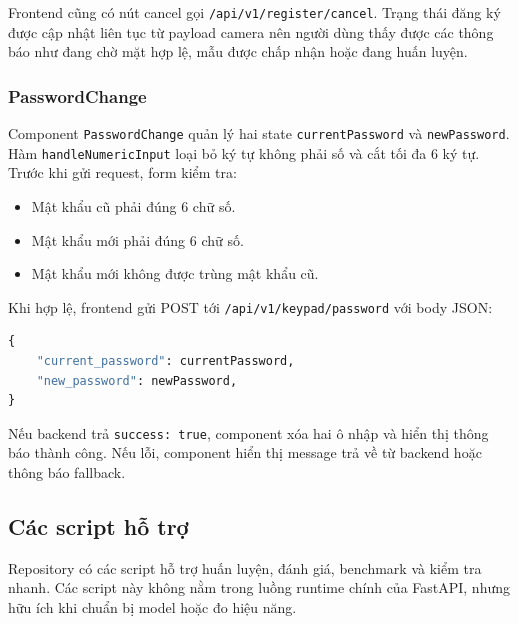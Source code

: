 Frontend cũng có nút cancel gọi \texttt{/api/v1/register/cancel}. Trạng thái đăng ký được cập nhật liên tục từ payload camera nên người dùng thấy được các thông báo như đang chờ mặt hợp lệ, mẫu được chấp nhận hoặc đang huấn luyện.

\subsubsection{PasswordChange}

Component \texttt{PasswordChange} quản lý hai state \texttt{currentPassword} và \texttt{newPassword}. Hàm \texttt{handleNumericInput} loại bỏ ký tự không phải số và cắt tối đa 6 ký tự. Trước khi gửi request, form kiểm tra:

\begin{itemize}
    \item Mật khẩu cũ phải đúng 6 chữ số.
    \item Mật khẩu mới phải đúng 6 chữ số.
    \item Mật khẩu mới không được trùng mật khẩu cũ.
\end{itemize}

Khi hợp lệ, frontend gửi POST tới \texttt{/api/v1/keypad/password} với body JSON:

\begin{lstlisting}[language=Python, caption={Request đổi mật khẩu keypad}]
{
    "current_password": currentPassword,
    "new_password": newPassword,
}
\end{lstlisting}

Nếu backend trả \texttt{success: true}, component xóa hai ô nhập và hiển thị thông báo thành công. Nếu lỗi, component hiển thị message trả về từ backend hoặc thông báo fallback.

\subsection{Các script hỗ trợ}

Repository có các script hỗ trợ huấn luyện, đánh giá, benchmark và kiểm tra nhanh. Các script này không nằm trong luồng runtime chính của FastAPI, nhưng hữu ích khi chuẩn bị model hoặc đo hiệu năng.

